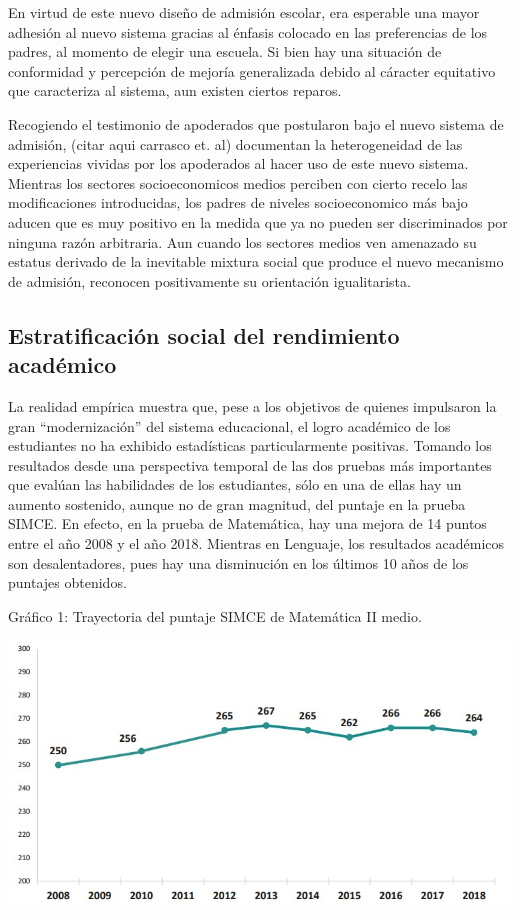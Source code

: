 \documentclass[
]{article}
\begin{document}
En virtud de este nuevo diseño de admisión escolar, era esperable una
mayor adhesión al nuevo sistema gracias al énfasis colocado en las
preferencias de los padres, al momento de elegir una escuela. Si bien
hay una situación de conformidad y percepción de mejoría generalizada
debido al cáracter equitativo que caracteriza al sistema, aun existen
ciertos reparos.

Recogiendo el testimonio de apoderados que postularon bajo el nuevo
sistema de admisión, (citar aqui carrasco et. al) documentan la
heterogeneidad de las experiencias vividas por los apoderados al hacer
uso de este nuevo sistema. Mientras los sectores socioeconomicos medios
perciben con cierto recelo las modificaciones introducidas, los padres
de niveles socioeconomico más bajo aducen que es muy positivo en la
medida que ya no pueden ser discriminados por ninguna razón arbitraria.
Aun cuando los sectores medios ven amenazado su estatus derivado de la
inevitable mixtura social que produce el nuevo mecanismo de admisión,
reconocen positivamente su orientación igualitarista.

\hypertarget{estratificaciuxf3n-social-del-rendimiento-acaduxe9mico}{%
\subsection{Estratificación social del rendimiento
académico}\label{estratificaciuxf3n-social-del-rendimiento-acaduxe9mico}}

La realidad empírica muestra que, pese a los objetivos de quienes
impulsaron la gran ``modernización'' del sistema educacional, el logro
académico de los estudiantes no ha exhibido estadísticas particularmente
positivas. Tomando los resultados desde una perspectiva temporal de las
dos pruebas más importantes que evalúan las habilidades de los
estudiantes, sólo en una de ellas hay un aumento sostenido, aunque no de
gran magnitud, del puntaje en la prueba SIMCE. En efecto, en la prueba
de Matemática, hay una mejora de 14 puntos entre el año 2008 y el año
2018. Mientras en Lenguaje, los resultados académicos son
desalentadores, pues hay una disminución en los últimos 10 años de los
puntajes obtenidos.

Gráfico 1: Trayectoria del puntaje SIMCE de Matemática II medio.

\includegraphics{input/images/trayectoria_sim_mate.jpg}
\end{document}
